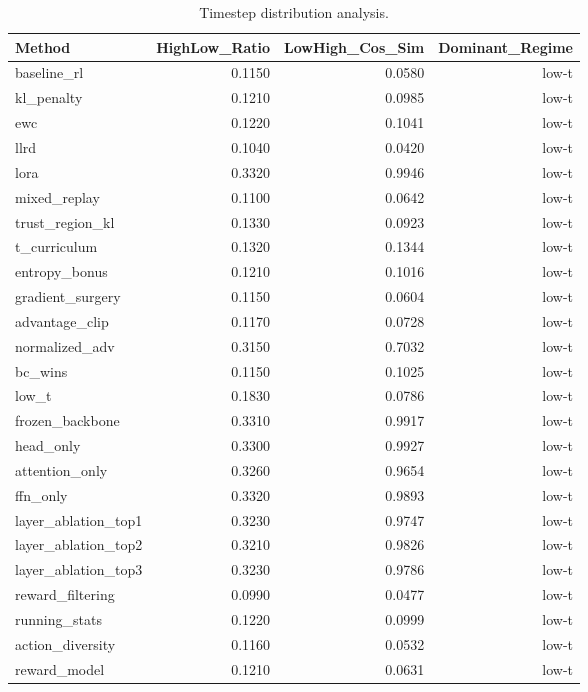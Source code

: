 \begin{table}[htbp]
\centering
\caption{Timestep distribution analysis.}
\label{tab:t_dist}
\begin{tabular}{lrrr}
\toprule
\textbf{Method} & \textbf{HighLow\_Ratio} & \textbf{LowHigh\_Cos\_Sim} & \textbf{Dominant\_Regime} \\
\midrule
baseline\_rl & 0.1150 & 0.0580 & low-t \\
kl\_penalty & 0.1210 & 0.0985 & low-t \\
ewc & 0.1220 & 0.1041 & low-t \\
llrd & 0.1040 & 0.0420 & low-t \\
lora & 0.3320 & 0.9946 & low-t \\
mixed\_replay & 0.1100 & 0.0642 & low-t \\
trust\_region\_kl & 0.1330 & 0.0923 & low-t \\
t\_curriculum & 0.1320 & 0.1344 & low-t \\
entropy\_bonus & 0.1210 & 0.1016 & low-t \\
gradient\_surgery & 0.1150 & 0.0604 & low-t \\
advantage\_clip & 0.1170 & 0.0728 & low-t \\
normalized\_adv & 0.3150 & 0.7032 & low-t \\
bc\_wins & 0.1150 & 0.1025 & low-t \\
low\_t & 0.1830 & 0.0786 & low-t \\
frozen\_backbone & 0.3310 & 0.9917 & low-t \\
head\_only & 0.3300 & 0.9927 & low-t \\
attention\_only & 0.3260 & 0.9654 & low-t \\
ffn\_only & 0.3320 & 0.9893 & low-t \\
layer\_ablation\_top1 & 0.3230 & 0.9747 & low-t \\
layer\_ablation\_top2 & 0.3210 & 0.9826 & low-t \\
layer\_ablation\_top3 & 0.3230 & 0.9786 & low-t \\
reward\_filtering & 0.0990 & 0.0477 & low-t \\
running\_stats & 0.1220 & 0.0999 & low-t \\
action\_diversity & 0.1160 & 0.0532 & low-t \\
reward\_model & 0.1210 & 0.0631 & low-t \\
\bottomrule
\end{tabular}
\end{table}